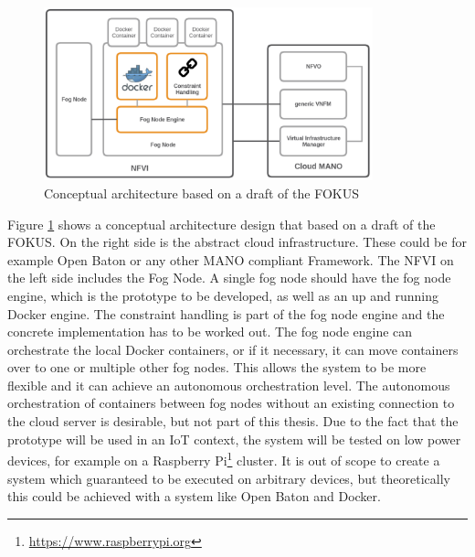 \begin{figure}[H]
    \centering
    \includegraphics[width=0.85\textwidth]{resources/images/conceptual_architecture.png}
    \caption[Conceptual architecture based on a draft of the \ac{FOKUS}]{Conceptual architecture based on a draft of the FOKUS}
    \label{fig:conceptual_architecture}
\end{figure}

Figure \ref{fig:conceptual_architecture} shows a conceptual architecture design that based on a draft of the \ac{FOKUS}.
On the right side is the abstract cloud infrastructure.
These could be for example Open Baton or any other \ac{MANO} compliant Framework.
The \ac{NFVI} on the left side includes the Fog Node.
A single fog node should have the fog node engine, which is the prototype to be developed, as well as an up and running Docker engine.
The constraint handling is part of the fog node engine and the concrete implementation has to be worked out.
The fog node engine can orchestrate the local Docker containers, or if it necessary, it can move containers over to one or multiple other fog nodes.
This allows the system to be more flexible and it can achieve an autonomous orchestration level.
The autonomous orchestration of containers between fog nodes without an existing connection to the cloud server is desirable, but not part of this thesis.
Due to the fact that the prototype will be used in an \ac{IoT} context, the system will be tested on low power devices, for example on a Raspberry Pi\footnote{\url{https://www.raspberrypi.org}} cluster.
It is out of scope to create a system which guaranteed to be executed on arbitrary devices, but theoretically this could be achieved with a system like Open Baton and Docker.


